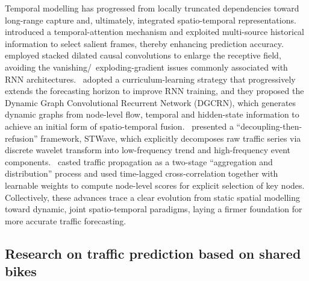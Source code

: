 \documentclass[preprint,12pt,authoryear]{elsarticle}
\begin{document}
Temporal modelling has progressed from locally truncated dependencies toward long-range capture and, ultimately, integrated spatio-temporal representations.~\cite{guo2019attention} introduced a temporal-attention mechanism and exploited multi-source historical information to select salient frames, thereby enhancing prediction accuracy.~\cite{wu2019graph} employed stacked dilated causal convolutions to enlarge the receptive field, avoiding the vanishing/~exploding-gradient issues commonly associated with RNN architectures.~\cite{li2023dynamic} adopted a curriculum-learning strategy that progressively extends the forecasting horizon to improve RNN training, and they proposed the  Dynamic Graph Convolutional Recurrent Network (DGCRN), which generates dynamic graphs from node-level flow, temporal and hidden-state information to achieve an initial form of spatio-temporal fusion.~\cite{fang2023spatio} presented a “decoupling-then-refusion” framework, STWave, which explicitly decomposes raw traffic series via discrete wavelet transform into low-frequency trend and high-frequency event components.~\cite{kong2024spatio} casted traffic propagation as a two-stage “aggregation and distribution” process and used time-lagged cross-correlation together with learnable weights to compute node-level scores for explicit selection of key nodes. Collectively, these advances trace a clear evolution from static spatial modelling toward dynamic, joint spatio-temporal paradigms, laying a firmer foundation for more accurate traffic forecasting.

\subsection{Research on traffic prediction based on shared bikes}
\end{document}
